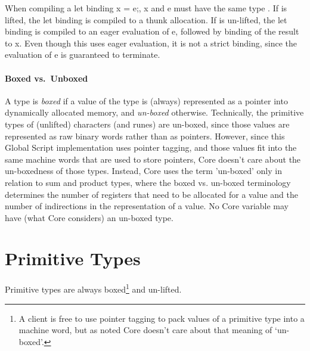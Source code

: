 \documentclass{report}
\newcommand\defn[1]{\emph{#1}}
\begin{document}
When compiling a let binding \<x = e;\>, \<x\> and \<e\> must have the same type \<\tau\>.
If \<\tau\> is lifted, the let binding is compiled to a thunk allocation.
If \<\tau\> is un-lifted, the let binding is compiled to an eager evaluation of \<e\>,
followed by binding of the result to \<x\>.
Even though this uses eager evaluation, it is not a strict binding, since the evaluation of \<e\> is guaranteed to terminate.

\paragraph{Boxed vs.~Unboxed}
A type is \defn{boxed} if a value of the type is (always) represented as a pointer into dynamically allocated memory,
and \defn{un-boxed} otherwise.
Technically, the primitive types of (unlifted) characters (and runes) are un-boxed,
since those values are represented as raw binary words rather than as pointers.
However, since this Global Script implementation uses pointer tagging,
and those values fit into the same machine words that are used to store pointers,
Core doesn't care about the un-boxedness of those types.
Instead, Core uses the term 'un-boxed' only in relation to sum and product types,
where the boxed vs. un-boxed terminology determines the number of registers that need to be allocated for a value and
the number of indirections in the representation of a value.
No Core variable may have (what Core considers) an un-boxed type.

\section{Primitive Types}

Primitive types are always boxed\footnote{
    A client is free to use pointer tagging to pack values of a primitive type into a machine word,
    but as noted Core doesn't care about that meaning of `un-boxed'.
} and un-lifted.
\end{document}
